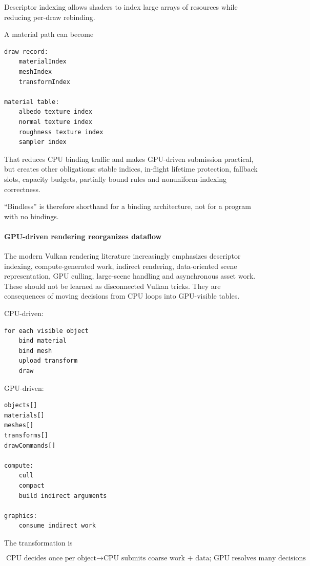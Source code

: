 Descriptor indexing allows shaders to index large arrays of resources while reducing per-draw rebinding.

A material path can become

\begin{verbatim}
draw record:
    materialIndex
    meshIndex
    transformIndex

material table:
    albedo texture index
    normal texture index
    roughness texture index
    sampler index
\end{verbatim}

That reduces CPU binding traffic and makes GPU-driven submission practical, but creates other obligations: stable indices, in-flight lifetime protection, fallback slots, capacity budgets, partially bound rules and nonuniform-indexing correctness.

``Bindless'' is therefore shorthand for a binding architecture, not for a program with no bindings.

\paragraph{GPU-driven rendering reorganizes dataflow}\label{gpu-driven-rendering-reorganizes-dataflow}

The modern Vulkan rendering literature increasingly emphasizes descriptor indexing, compute-generated work, indirect rendering, data-oriented scene representation, GPU culling, large-scene handling and asynchronous asset work. These should not be learned as disconnected Vulkan tricks. They are consequences of moving decisions from CPU loops into GPU-visible tables.

CPU-driven:

\begin{verbatim}
for each visible object
    bind material
    bind mesh
    upload transform
    draw
\end{verbatim}

GPU-driven:

\begin{verbatim}
objects[]
materials[]
meshes[]
transforms[]
drawCommands[]

compute:
    cull
    compact
    build indirect arguments

graphics:
    consume indirect work
\end{verbatim}

The transformation is

\[
\boxed{
\text{CPU decides once per object}
\rightarrow
\text{CPU submits coarse work + data; GPU resolves many decisions}
}
\]

